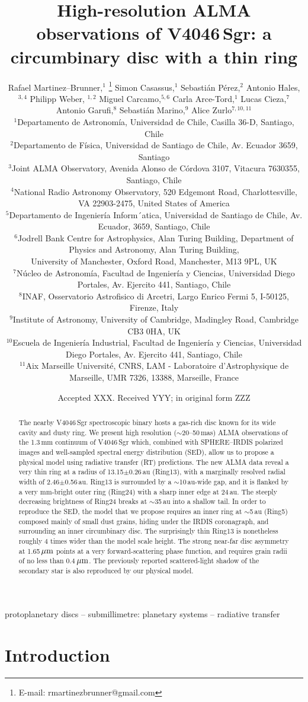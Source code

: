 \documentclass[fleqn,usenatbib,useAMS]{mnras}
\title[High-resolution ALMA observations of V4046\,Sgr]{High-resolution ALMA observations of V4046\,Sgr: a circumbinary disc with a thin ring}
\author[R. Martinez Brunner et al.]{Rafael Martinez--Brunner,$^{1}$
\thanks{E-mail: rmartinezbrunner@gmail.com}
Simon Casassus,$^{1}$
Sebasti\'an P\'erez,$^{2}$
Antonio Hales,$^{3,4}$
Philipp Weber, $^{1,2}$ \newauthor
Miguel Carcamo,$^{5,6}$
Carla Arce-Tord,$^{1}$
Lucas Cieza,$^{7}$
Antonio Garufi,$^{8}$
Sebasti\'an Marino,$^{9}$
Alice Zurlo$^{7,10,11}$
\\
$^{1}$Departamento de Astronom\'ia, Universidad de Chile, Casilla 36-D, Santiago, Chile\\
$^{2}$Departamento de F\'isica, Universidad de Santiago de Chile, Av. Ecuador 3659, Santiago\\
$^{3}$Joint ALMA Observatory, Avenida Alonso de C\'ordova 3107, Vitacura 7630355, Santiago, Chile \\
$^{4}$National Radio Astronomy Observatory, 520 Edgemont Road, Charlottesville, VA 22903-2475, United States of America \\
$^{5}$Departamento de Ingenier\'ia Inform´atica, Universidad de Santiago de Chile, Av. Ecuador, 3659, Santiago, Chile\\
$^{6}$Jodrell Bank Centre for Astrophysics, Alan Turing Building, Department of Physics and Astronomy, Alan Turing Building,\\ University of Manchester, Oxford Road, Manchester, M13 9PL, UK \\
$^{7}$N\'ucleo de Astronom\'ia, Facultad de Ingenier\'ia y Ciencias, Universidad Diego Portales, Av. Ejercito 441, Santiago, Chile\\
$^{8}$INAF, Osservatorio Astrofisico di Arcetri, Largo Enrico Fermi 5, I-50125, Firenze, Italy\\
$^{9}$Institute of Astronomy, University of Cambridge, Madingley Road, Cambridge CB3 0HA, UK\\
$^{10}$Escuela de Ingenier\'ia Industrial, Facultad de Ingenier\'ia y Ciencias, Universidad Diego Portales, Av. Ejercito 441, Santiago, Chile \\
$^{11}$Aix Marseille Universit\'e, CNRS, LAM - Laboratoire d'Astrophysique de Marseille, UMR 7326, 13388, Marseille, France  \\
}
\date{Accepted XXX. Received YYY; in original form ZZZ}
\begin{document}
\label{firstpage}
\pagerange{\pageref{firstpage}--\pageref{lastpage}}
\maketitle

\begin{abstract}
    The nearby V4046\,Sgr spectroscopic binary hosts a gas-rich disc known for its wide cavity and dusty ring.  We present high resolution ($\sim$20--50\,mas) ALMA observations of the 1.3\,mm  continuum of V4046\,Sgr which, combined with SPHERE--IRDIS polarized images and well-sampled spectral energy distribution (SED), allow us to propose a physical model using radiative transfer (RT) predictions. The new ALMA data reveal a very thin ring at a radius of 13.15$\pm$0.26\,au (Ring13), with a marginally resolved radial width of 2.46$\pm$0.56\,au. Ring13 is surrounded by a $\sim$10\,au-wide gap, and it is flanked by a very mm-bright outer ring (Ring24) with a sharp inner edge at 24\,au. The steeply decreasing brightness of Ring24 breaks at $\sim$35\,au into a shallow tail. In order to reproduce the SED, the model that we propose requires an inner ring at $\sim$5\,au (Ring5) composed mainly of small dust grains, hiding under the IRDIS coronagraph, and surrounding an inner circumbinary disc. The surprisingly thin Ring13 is nonetheless roughly 4 times wider than the model scale height. The strong near-far disc asymmetry at 1.65\,$\hbox{$\mu$m}$ points at a very forward-scattering phase function, and requires grain radii of no less than 0.4\,$\hbox{$\mu$m}$. The previously reported scattered-light shadow of the secondary star is also reproduced by our physical model.
\end{abstract}

\begin{keywords}
 protoplanetary discs -- submillimetre: planetary systems -- radiative transfer
\end{keywords}



\section{Introduction} \label{sec:Introduction}
\end{document}
